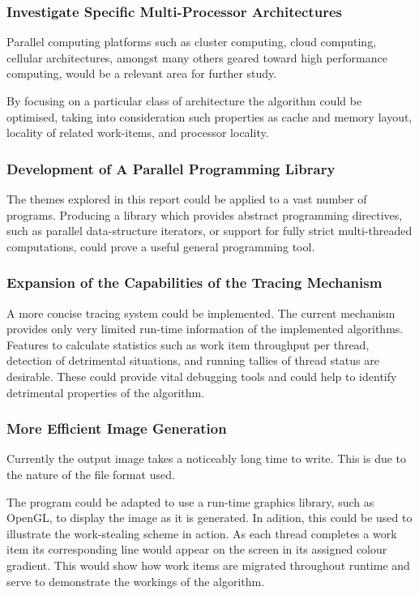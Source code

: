 \subsubsection*{Investigate Specific Multi-Processor Architectures}
Parallel computing platforms such as cluster computing, cloud computing, cellular architectures, amongst many others 
geared toward high performance computing, would be a relevant  area for further study. 

By focusing on a particular class of architecture the algorithm could be optimised, taking into consideration such 
properties as cache and memory layout, locality of related work-items, and processor locality. 

\subsubsection*{Development of A Parallel Programming Library}
The themes explored in this report could be applied to a vast number of programs. 
Producing a library which provides abstract programming directives, such as parallel data-structure iterators, or
support for fully strict multi-threaded computations, could prove a useful general programming tool. 

\subsubsection*{Expansion of the Capabilities of the Tracing Mechanism}
A more concise tracing system could be implemented. The current mechanism provides only very limited run-time information
of the implemented algorithms. 
Features to calculate statistics such as work item throughput per thread, detection of detrimental situations, and running 
tallies of thread status are desirable. These could provide vital debugging tools and could help to identify detrimental 
properties of the algorithm.

\subsubsection*{More Efficient Image Generation}
Currently the output image takes a noticeably long time to write. This is due to the nature of the file format used.

The program could be adapted to use a run-time graphics library, such as OpenGL, to display the image as it is generated.
In adition, this could be used to illustrate the work-stealing scheme in action. As each thread completes a work item its corresponding
line would appear on the screen in its assigned colour gradient. This would show how work items are migrated throughout runtime and serve
to demonstrate the workings of the algorithm.


